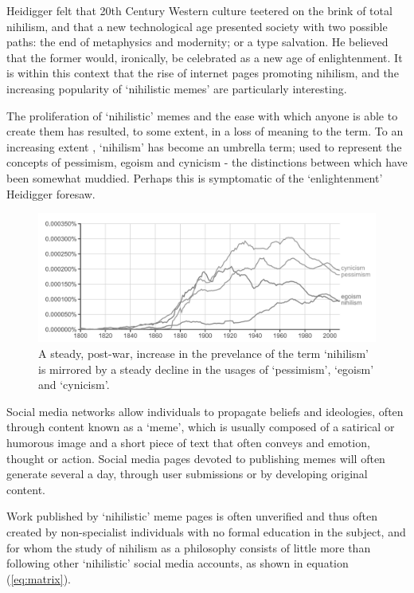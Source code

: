 \documentclass[a4paper, 10pt]{IEEEtran}
\begin{document}
Heidigger felt that 20th Century Western culture teetered on the brink of total nihilism, and that a new technological age presented society with two possible paths: the end of metaphysics and modernity; or a type salvation. He believed that the former would, ironically, be celebrated as a new age of enlightenment. It is within this context that the rise of internet pages promoting nihilism, and the increasing popularity of `nihilistic memes' are particularly interesting. \par

The proliferation of `nihilistic' memes and the ease with which anyone is able to create them has resulted, to some extent, in a loss of meaning to the term. To an increasing extent \cite{npec1}, `nihilism' has become an umbrella term; used to represent the concepts of pessimism, egoism and cynicism - the distinctions between which have been somewhat muddied. Perhaps this is symptomatic of the `enlightenment' Heidigger foresaw.

\begin{figure}[b] %
\label{fig:usage}
\centering
\begin{minipage}{.8\linewidth} %
	\includegraphics[width=\linewidth]{usage.png}
	\caption{A steady, post-war, increase in the prevelance of the term `nihilism' is mirrored by a steady decline in the usages of `pessimism', `egoism' and `cynicism'.}
\end{minipage}
\end{figure}

Social media networks allow individuals to propagate beliefs and ideologies, often through content known as a `meme', which is usually composed of a satirical or humorous image and a short piece of text that often conveys and emotion, thought or action. Social media pages devoted to publishing memes will often generate several a day, through user submissions or by developing original content.

Work published by `nihilistic' meme pages is often unverified and thus often created by non-specialist individuals with no formal education in the subject, and for whom the study of nihilism as a philosophy consists of little more than following other `nihilistic' social media accounts, as shown in equation (\ref{eq:matrix}).
\end{document}
